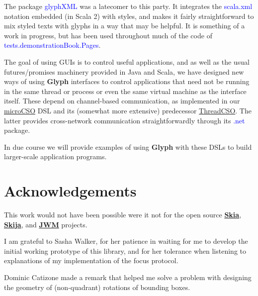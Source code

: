 \documentclass[12pt,a4paper]{article}
\def\Glyph{\textbf{Glyph}\xspace}
\def\Scala#1{\textcolor{blue}{\textsf{#1}}}
\def\S#1{\section{#1}}
\begin{document}
The package \Scala{glyphXML} was a latecomer to this party. It
integrates the \Scala{scala.xml}  notation embedded (in Scala 2)
with styles, and makes it fairly straightforward to mix styled
texts with glyphs in a way that may be helpful. It is
something of a work in progress, but has been used throughout much
of the code of \Scala{tests.demonstrationBook.Pages}.

The goal of using  GUIs is to control useful applications,
and as well as the usual futures/promises machinery provided
in Java and Scala, we have designed new ways of using \Glyph interfaces to
control applications that need not be running in the same thread or process
or even the same virtual machine as the interface itself. These depend
on channel-based communication, as implemented in our
\href{https://github.com/sufrin/microCSO}{microCSO}
DSL and its (somewhat more extensive) predecessor
\href{https://github.com/sufrin/ThreadCSO}{ThreadCSO}. The latter
provides cross-network communication straightforwardly through its
\Scala{.net} package.

In due course we will provide examples of using \Glyph with these DSLs
to build larger-scale application programs.



\S{Acknowledgements}
This work would not have been possible were it not for the
open source \href{https://skia.org/}{\textbf{Skia}},
\href{https://github.com/HumbleUI/HumbleUI}{\textbf{Skija}},
and \href{https://github.com/HumbleUI/JWM}{\textbf{JWM}} projects.

I am grateful to Sasha Walker,
for her patience in waiting for me to develop the initial working prototype of this
library, and for her tolerance when listening to explanations of my implementation
of the focus protocol. 

Dominic Catizone\Footnotemark{$*$} made a remark that helped me solve a
problem with designing the geometry of (non-quadrant) rotations of bounding boxes.
\end{document}
